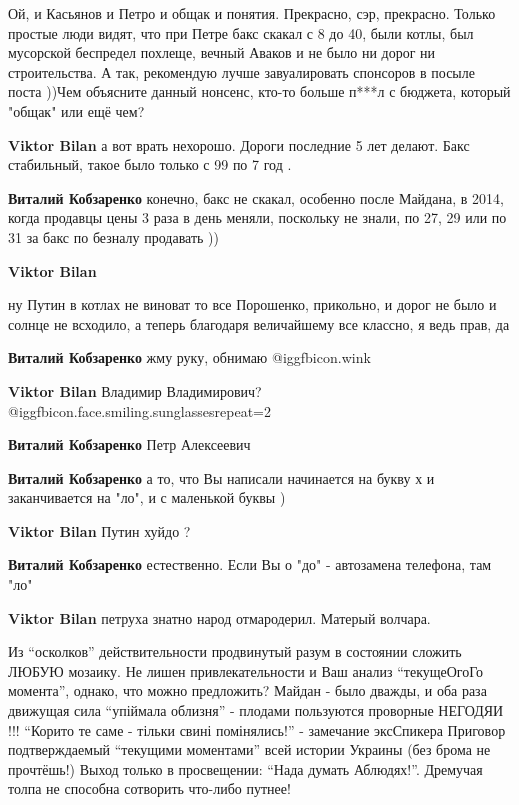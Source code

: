 \begin{itemize}

Ой, и Касьянов и Петро и общак и понятия. Прекрасно, сэр, прекрасно. Только
простые люди видят, что при Петре бакс скакал с 8 до 40, были котлы, был
мусорской беспредел похлеще, вечный Аваков и не было ни дорог ни строительства.
А так, рекомендую лучше завуалировать спонсоров в посыле поста ))Чем объясните
данный нонсенс, кто-то больше п***л с бюджета, который "общак" или ещё чем?

\begin{itemize} %
\textbf{Viktor Bilan} а вот врать нехорошо. Дороги последние 5 лет делают. Бакс стабильный, такое было только с 99 по 7 год .

\textbf{Виталий Кобзаренко} конечно, бакс не скакал, особенно после Майдана, в 2014, когда продавцы цены 3 раза в день меняли, поскольку не знали, по 27, 29 или по 31 за бакс по безналу продавать ))

\textbf{Viktor Bilan} 

ну Путин в котлах не виноват то все Порошенко, прикольно, и дорог не было и
солнце не всходило, а теперь благодаря величайшему все классно, я ведь прав, да


\textbf{Виталий Кобзаренко} жму руку, обнимаю  @igg{fbicon.wink} 

\textbf{Viktor Bilan} Владимир Владимирович?  @igg{fbicon.face.smiling.sunglasses}{repeat=2} 

\textbf{Виталий Кобзаренко} Петр Алексеевич

\textbf{Виталий Кобзаренко} а то, что Вы написали начинается на букву х и заканчивается на "ло", и с маленькой буквы )

\textbf{Viktor Bilan} Путин хуйдо ?

\textbf{Виталий Кобзаренко} естественно. Если Вы о "до" - автозамена телефона, там "ло"

\textbf{Viktor Bilan} петруха знатно народ отмародерил. Матерый волчара.
\end{itemize} %


Из \enquote{осколков} действительности продвинутый разум в состоянии сложить ЛЮБУЮ
мозаику. Не лишен привлекательности и Ваш анализ \enquote{текущеОгоГо момента}, однако,
что можно предложить? Майдан - было дважды, и оба раза движущая сила \enquote{упіймала
облизня} - плодами пользуются проворные НЕГОДЯИ !!! \enquote{Корито те саме - тільки
свині помінялись!} - замечание эксСпикера Приговор подтверждаемый \enquote{текущими
моментами} всей истории Украины (без брома не прочтёшь!) Выход только в
просвещении: \enquote{Нада думать Аблюдях!}. Дремучая толпа не способна сотворить
что-либо путнее!



\end{itemize}
